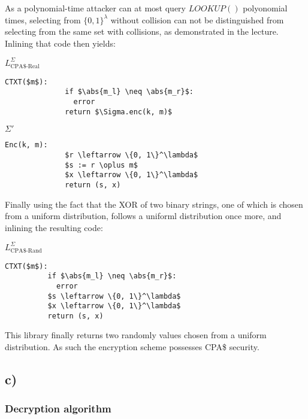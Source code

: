 \documentclass[a4paper]{scrreprt}
\DeclarePairedDelimiter\abs{\lvert}{\rvert}
\begin{document}
As a polynomial-time attacker can at most query $LOOKUP()$ polyonomial times,
selecting from $\{0, 1\}^\lambda$ without collision can not be distinguished
from selecting from the same set with collisions, as demonstrated in the
lecture. Inlining that code then yields:

\begin{tcbraster}[raster columns=2,raster equal height,nobeforeafter,raster column skip=2cm]
	\begin{library}{$L^{\Sigma}_{\text{CPA\$-Real}}$}
		\begin{lstlisting}[mathescape=true,autogobble=true]
			CTXT($m$):
			  if $\abs{m_l} \neq \abs{m_r}$:
			    error
			  return $\Sigma.enc(k, m)$
		\end{lstlisting}
	\end{library}
	\begin{library}{$\Sigma'$}
		\begin{lstlisting}[mathescape=true,autogobble=true]
			Enc(k, m):
			  $r \leftarrow \{0, 1\}^\lambda$
			  $s := r \oplus m$
			  $x \leftarrow \{0, 1\}^\lambda$
			  return (s, x)
		\end{lstlisting}
	\end{library}
\end{tcbraster}

Finally using the fact that the XOR of two binary strings, one of which is
chosen from a uniform distribution, follows a uniforml distribution once more,
and inlining the resulting code:

\begin{library}{$L^{\Sigma}_{\text{CPA\$-Rand}}$}
	\begin{lstlisting}[mathescape=true,autogobble=true]
		CTXT($m$):
		  if $\abs{m_l} \neq \abs{m_r}$:
		    error
		  $s \leftarrow \{0, 1\}^\lambda$
		  $x \leftarrow \{0, 1\}^\lambda$
		  return (s, x)
	\end{lstlisting}
\end{library}

This library finally returns two randomly values chosen from a uniform
distribution.  As such the encryption scheme possesses CPA\$ security.


\subsection{c)}

\subsubsection{Decryption algorithm}
\end{document}
